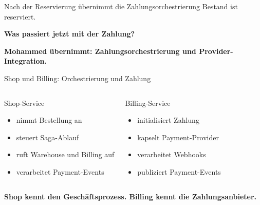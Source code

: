 \documentclass[aspectratio=169,11pt]{beamer}
\newcommand{\storyline}[1]{\vspace{.25cm}\begin{center}\colorbox{hsBlue!8}{\parbox{.92\linewidth}{\centering\small\textbf{#1}}}\end{center}}
\begin{document}
\begin{frame}{Nach der Reservierung übernimmt die Zahlungsorchestrierung}
\centering
\vspace{.25cm}
{\Large Bestand ist reserviert.}\par
\vspace{.35cm}
{\Huge \textbf{Was passiert jetzt mit der Zahlung?}}\par
\vspace{.7cm}
\vspace{.5cm}
\storyline{Mohammed übernimmt: Zahlungsorchestrierung und Provider-Integration.}
\end{frame}

\begin{frame}{Shop und Billing: Orchestrierung und Zahlung}
\begin{columns}[T,onlytextwidth]
\begin{block}{Shop-Service}
\begin{itemize}
  \item nimmt Bestellung an
  \item steuert Saga-Ablauf
  \item ruft Warehouse und Billing auf
  \item verarbeitet Payment-Events
\end{itemize}
\end{block}
\begin{block}{Billing-Service}
\begin{itemize}
  \item initialisiert Zahlung
  \item kapselt Payment-Provider
  \item verarbeitet Webhooks
  \item publiziert Payment-Events
\end{itemize}
\end{block}
\end{columns}
\storyline{Shop kennt den Geschäftsprozess. Billing kennt die Zahlungsanbieter.}
\end{frame}
\end{document}
